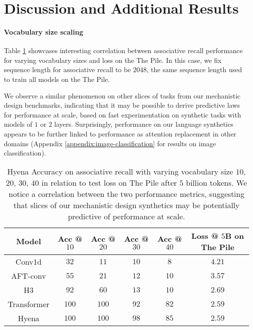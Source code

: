 %
\section{Discussion and Additional Results}\label{app:add_results}
%

\paragraph{Vocabulary size scaling}
%

Table \ref{scaling_vsize} showcases interesting correlation between associative recall performance for varying vocabulary sizes and loss on the {\sc The Pile}. In this case, we fix sequence length for associative recall to be $2048$, the same sequence length used to train all models on the {\sc The Pile}.

We observe a similar phenomenon on other slices of tasks from our mechanistic design benchmarks, indicating that it may be possible to derive predictive laws for performance at scale, based on fast experimentation on synthetic tasks with models of $1$ or $2$ layers. Surprisingly, performance on our language synthetics appears to be further linked to performance as attention replacement in other domains (Appendix \ref{appendix:image-classification} for results on image classification).

\begin{table}[!bh]
\small
\centering
\caption{{\sf Hyena} Accuracy on associative recall with varying vocabulary size $10$, $20$, $30$, $40$ in relation to test loss on {\sc The Pile} after $5$ billion tokens. We notice a correlation between the two performance metrics, suggesting that slices of our mechanistic design synthetics may be potentially predictive of performance at scale.}
\vspace{2mm}
\label{scaling_vsize}
\setlength{\tabcolsep}{4pt}
\begin{tabular}{@{}c|ccccc@{}}
\toprule
Model & Acc @ $10$ & Acc @ $20$ & Acc @ $30$ & Acc @ $40$ & Loss @ $5$B on {\sc The Pile} \\
\midrule 
Conv1d & $32$ & $11$ & $10$ & $8$ & $4.21$\\ 
AFT-conv & $55$ & $21$ & $12$ & $10$ & $3.57$\\ 
H3 & $92$ & $60$ & $13$ & $10$ & $2.69$\\
Transformer & $100$ & $100$ & $92$ & $82$ & $2.59$\\ 
{\sf Hyena} & $100$ & $100$ & $98$ & $85$ & $2.59$\\ 
\bottomrule
\end{tabular}
\end{table}

